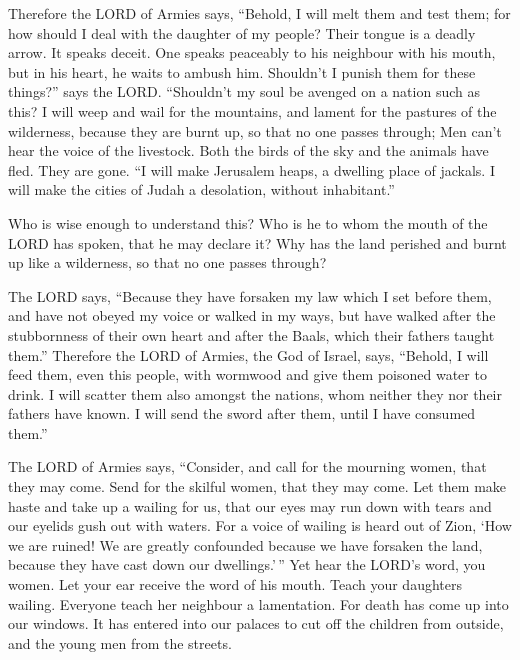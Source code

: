  Therefore the LORD of Armies says, ``Behold, I will melt
them and test them; for how should I deal with the daughter of my
people?  Their tongue is a deadly arrow. It speaks deceit.
One speaks peaceably to his neighbour with his mouth, but in his heart,
he waits to ambush him.  Shouldn't I punish them for these
things?'' says the LORD. ``Shouldn't my soul be avenged on a nation such
as this?  I will weep and wail for the mountains, and
lament for the pastures of the wilderness, because they are burnt up, so
that no one passes through; Men can't hear the voice of the livestock.
Both the birds of the sky and the animals have fled. They are gone.
 ``I will make Jerusalem heaps, a dwelling place of
jackals. I will make the cities of Judah a desolation, without
inhabitant.''

 Who is wise enough to understand this? Who is he to whom
the mouth of the LORD has spoken, that he may declare it? Why has the
land perished and burnt up like a wilderness, so that no one passes
through?

 The LORD says, ``Because they have forsaken my law which I
set before them, and have not obeyed my voice or walked in my ways,
 but have walked after the stubbornness of their own heart
and after the Baals, which their fathers taught them.'' 
Therefore the LORD of Armies, the God of Israel, says, ``Behold, I will
feed them, even this people, with wormwood and give them poisoned water
to drink.  I will scatter them also amongst the nations,
whom neither they nor their fathers have known. I will send the sword
after them, until I have consumed them.''

 The LORD of Armies says, ``Consider, and call for the
mourning women, that they may come. Send for the skilful women, that
they may come.  Let them make haste and take up a wailing
for us, that our eyes may run down with tears and our eyelids gush out
with waters.  For a voice of wailing is heard out of Zion,
`How we are ruined! We are greatly confounded because we have forsaken
the land, because they have cast down our dwellings.'\,'' 
Yet hear the LORD's word, you women. Let your ear receive the word of
his mouth. Teach your daughters wailing. Everyone teach her neighbour a
lamentation.  For death has come up into our windows. It
has entered into our palaces to cut off the children from outside, and
the young men from the streets.

